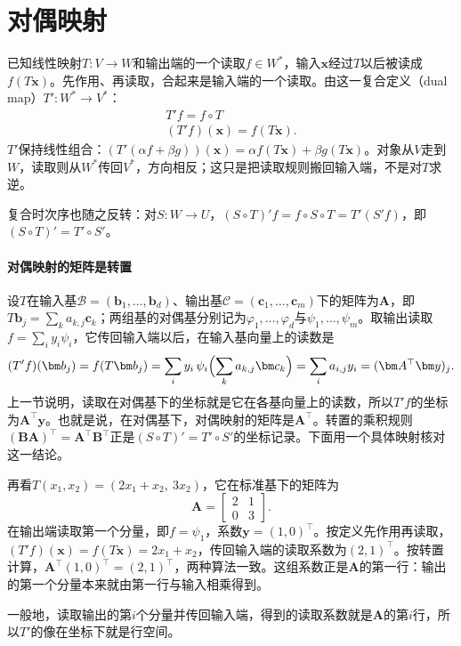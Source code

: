 
\section{对偶映射}
\label{sec:ls-dual-map}

已知线性映射$T:V\to W$和输出端的一个读取$f\in W^*$，输入$\bm x$经过$T$以后被读成$f(T\bm x)$。先作用、再读取，合起来是输入端的一个读取。由这一复合定义（dual map）$T':W^*\to V^*$：
\begin{equation}
\begin{gathered}
T'f=f\circ T\\
(T'f)(\bm x)=f(T\bm x).
\end{gathered}
\label{eq:ls-dual-map-def}
\end{equation}
$T'$保持线性组合：$(T'(\alpha f+\beta g))(\bm x)=\alpha f(T\bm x)+\beta g(T\bm x)$。对象从$V$走到$W$，读取则从$W^*$传回$V^*$，方向相反；这只是把读取规则搬回输入端，不是对$T$求逆。

复合时次序也随之反转：对$S:W\to U$，$(S\circ T)'f=f\circ S\circ T=T'(S'f)$，即$(S\circ T)'=T'\circ S'$。

\paragraph{对偶映射的矩阵是转置}
设$T$在输入基$\mathcal B=(\bm b_1,\ldots,\bm b_d)$、输出基$\mathcal C=(\bm c_1,\ldots,\bm c_m)$下的矩阵为$\bm A$，即$T\bm b_j=\sum_ka_{k,j}\bm c_k$；两组基的对偶基分别记为$\varphi_1,\ldots,\varphi_d$与$\psi_1,\ldots,\psi_m$。取输出读取$f=\sum_iy_i\psi_i$，它传回输入端以后，在输入基向量上的读数是
\[
 (T'f)(\bm b_j)=f(T\bm b_j)
 =\sum_iy_i\,\psi_i\Bigl(\sum_ka_{k,j}\bm c_k\Bigr)
 =\sum_ia_{i,j}y_i=(\bm A^\top\bm y)_j .
\]
上一节说明，读取在对偶基下的坐标就是它在各基向量上的读数，所以$T'f$的坐标为$\bm A^\top\bm y$。也就是说，在对偶基下，对偶映射的矩阵是$\bm A^\top$。转置的乘积规则$(\bm B\bm A)^\top=\bm A^\top\bm B^\top$正是$(S\circ T)'=T'\circ S'$的坐标记录。下面用一个具体映射核对这一结论。
\begin{example}[把输出的第一个分量读取传回输入端]
\label{ex:ls-dual-map-first-component}
再看$T(x_1,x_2)=(2x_1+x_2,\ 3x_2)$，它在标准基下的矩阵为
\[
 \bm A=\begin{bmatrix}2&1\\0&3\end{bmatrix}.
\]
在输出端读取第一个分量，即$f=\psi_1$，系数$\bm y=(1,0)^\top$。按定义先作用再读取，$(T'f)(\bm x)=f(T\bm x)=2x_1+x_2$，传回输入端的读取系数为$(2,1)^\top$。按转置计算，$\bm A^\top(1,0)^\top=(2,1)^\top$，两种算法一致。这组系数正是$\bm A$的第一行：输出的第一个分量本来就由第一行与输入相乘得到。
\end{example}
一般地，读取输出的第$i$个分量并传回输入端，得到的读取系数就是$\bm A$的第$i$行，所以$T'$的像在坐标下就是行空间。


